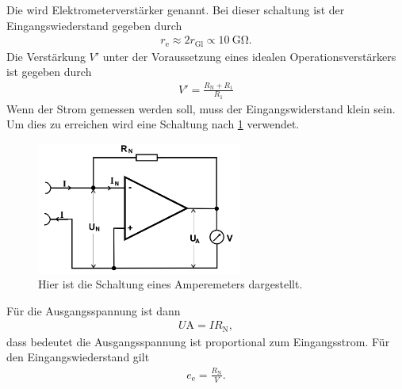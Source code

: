 Die wird Elektrometerverstärker genannt.
Bei dieser schaltung ist der Eingangswiederstand gegeben durch
\begin{align}
	r_\text{e}\approx 2r_\text{Gl}\propto \SI{10}{\giga\ohm}.
\end{align}
Die Verstärkung $V'$ unter der Voraussetzung eines idealen Operationsverstärkers ist gegeben durch
\begin{align}
	V'=\frac{R_\text{N}+R_1}{R_1 }
\end{align}
Wenn der Strom gemessen werden soll, muss der Eingangswiderstand klein sein.
Um dies zu erreichen wird eine Schaltung nach \cref{fig:Amperemeter} verwendet.
\begin{figure}[h!]
	\centering
	\includegraphics[width = 0.6\textwidth]{../Grafiken/Amperemeter.png}
	\caption{Hier ist die Schaltung eines Amperemeters dargestellt. \cite{V51}\label{fig:Amperemeter}}
\end{figure}
Für die Ausgangsspannung ist dann
\begin{align}
	U\text{A}=IR_\text{N},
\end{align}
dass bedeutet die Ausgangsspannung ist proportional zum Eingangsstrom.
Für den Eingangswiederstand gilt\\
\begin{align*}
	e_\text{e}=\frac{R_\text{N}}{V}.
\end{align*}
